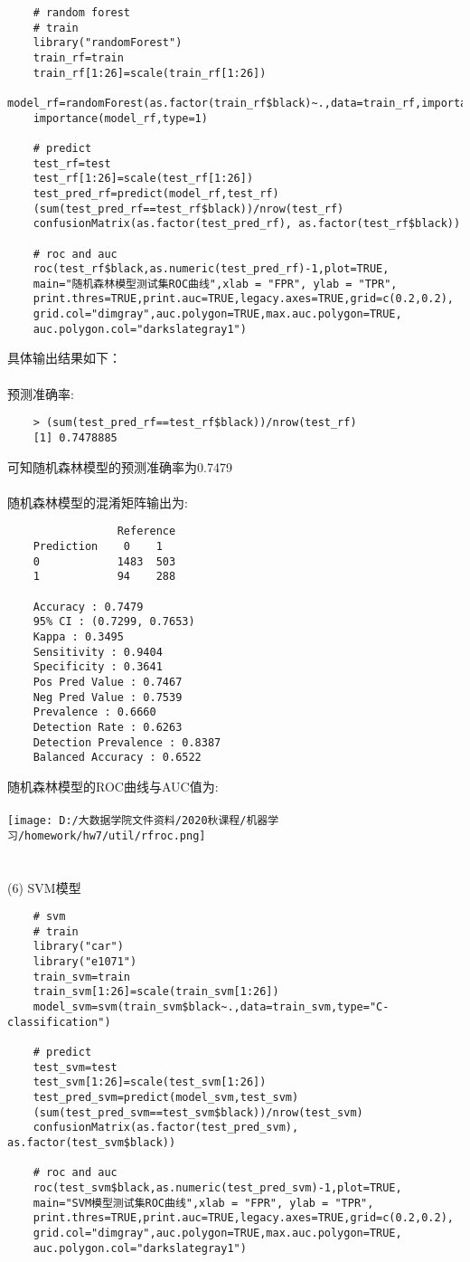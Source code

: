 \documentclass[]{article}
\begin{document}
\begin{lstlisting}
	# random forest
	# train
	library("randomForest")
	train_rf=train
	train_rf[1:26]=scale(train_rf[1:26])
	model_rf=randomForest(as.factor(train_rf$black)~.,data=train_rf,importance=T)
	importance(model_rf,type=1)
	
	# predict
	test_rf=test
	test_rf[1:26]=scale(test_rf[1:26])
	test_pred_rf=predict(model_rf,test_rf)
	(sum(test_pred_rf==test_rf$black))/nrow(test_rf)
	confusionMatrix(as.factor(test_pred_rf), as.factor(test_rf$black))
	
	# roc and auc
	roc(test_rf$black,as.numeric(test_pred_rf)-1,plot=TRUE,
	main="随机森林模型测试集ROC曲线",xlab = "FPR", ylab = "TPR",
	print.thres=TRUE,print.auc=TRUE,legacy.axes=TRUE,grid=c(0.2,0.2),
	grid.col="dimgray",auc.polygon=TRUE,max.auc.polygon=TRUE,
	auc.polygon.col="darkslategray1")
\end{lstlisting} 
具体输出结果如下：\\\\
预测准确率:
\begin{lstlisting}
	> (sum(test_pred_rf==test_rf$black))/nrow(test_rf)
	[1] 0.7478885
\end{lstlisting}
可知随机森林模型的预测准确率为0.7479\\\\
随机森林模型的混淆矩阵输出为:
\begin{lstlisting}
	             Reference
	Prediction    0    1
	0            1483  503
	1            94    288
	
	Accuracy : 0.7479          
	95% CI : (0.7299, 0.7653)
	Kappa : 0.3495          
	Sensitivity : 0.9404          
	Specificity : 0.3641          
	Pos Pred Value : 0.7467          
	Neg Pred Value : 0.7539          
	Prevalence : 0.6660          
	Detection Rate : 0.6263          
	Detection Prevalence : 0.8387          
	Balanced Accuracy : 0.6522          
\end{lstlisting}
随机森林模型的ROC曲线与AUC值为:\\\\
\texttt{[image: D:/大数据学院文件资料/2020秋课程/机器学习/homework/hw7/util/rfroc.png]}\\\\\\
(6) SVM模型
\begin{lstlisting}
	# svm
	# train
	library("car")
	library("e1071")
	train_svm=train
	train_svm[1:26]=scale(train_svm[1:26])
	model_svm=svm(train_svm$black~.,data=train_svm,type="C-classification")
	
	# predict
	test_svm=test
	test_svm[1:26]=scale(test_svm[1:26])
	test_pred_svm=predict(model_svm,test_svm)
	(sum(test_pred_svm==test_svm$black))/nrow(test_svm)
	confusionMatrix(as.factor(test_pred_svm), as.factor(test_svm$black))
	
	# roc and auc
	roc(test_svm$black,as.numeric(test_pred_svm)-1,plot=TRUE,
	main="SVM模型测试集ROC曲线",xlab = "FPR", ylab = "TPR",
	print.thres=TRUE,print.auc=TRUE,legacy.axes=TRUE,grid=c(0.2,0.2),
	grid.col="dimgray",auc.polygon=TRUE,max.auc.polygon=TRUE,
	auc.polygon.col="darkslategray1")
\end{lstlisting} 
\end{document}
